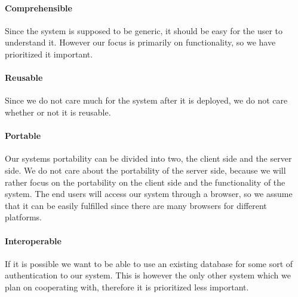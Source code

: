 \paragraph{Comprehensible}
Since the \hdesk[] system is supposed to be generic, it should be easy for the user to understand it.
However our focus is primarily on functionality, so we have prioritized it important.
\paragraph{Reusable}
Since we do not care much for the system after it is deployed, we do not care whether or not it is reusable.
\paragraph{Portable}
Our systems portability can be divided into two, the client side and the server side.
We do not care about the portability of the server side, because we will rather focus on the portability on the client side and the functionality of the system.
The end users will access our system through a browser, so we assume that it can be easily fulfilled since there are many browsers for different platforms\cite{chrome10}.
\paragraph{Interoperable}
If it is possible we want to be able to use an existing database for some sort of authentication to our system.
This is however the only other system which we plan on cooperating with, therefore it is prioritized less important.